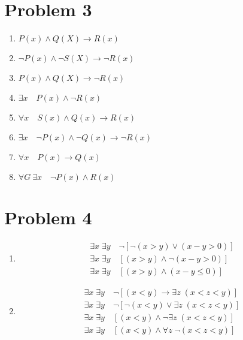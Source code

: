 \documentclass{article}
\begin{document}
\section*{Problem 3}
\begin{enumerate}

    \item %
    $P(x) \land Q(X) \to R(x)$
    \item %
    $\lnot P(x) \land \lnot S(X) \to \lnot R(x)$
    \item %
    $P(x) \land Q(X) \to \lnot R(x)$
    \item %
    $\exists x \quad P(x) \land \lnot R(x)$
    \item %
    $\forall x \quad S(x) \land Q(x) \to R(x)$
    \item %
    $\exists x \quad \lnot P(x) \land \lnot Q(x) \to \lnot R(x)$
    \item %
    $\forall x \quad P(x) \to Q(x)$
    \item %
    $\forall G \: \exists x \quad \lnot P(x) \land R(x)$
    
\end{enumerate}

\section*{Problem 4}
\begin{enumerate}

    \item %
    
    \begin{align*}
    \exists x \; \exists y \quad \lnot [\lnot (x > y) \lor (x - y > 0)] \\
    \exists x \; \exists y \quad [(x > y) \land \lnot (x - y > 0)] \\
    \exists x \; \exists y \quad [(x > y) \land (x - y \leq 0)]
    \end{align*}

    \item %
    
    \begin{align*}
    \exists x \; \exists y \quad \lnot [(x < y) \to \exists z \; (x < z < y)] \\
    \exists x \; \exists y \quad \lnot [\lnot (x < y) \lor \exists z \; (x < z < y)] \\
    \exists x \; \exists y \quad [(x < y) \land \lnot \exists z \; (x < z < y)] \\
    \exists x \; \exists y \quad [(x < y) \land \forall z \; \lnot (x < z < y)]
    \end{align*}
    
\end{enumerate}
\end{document}
